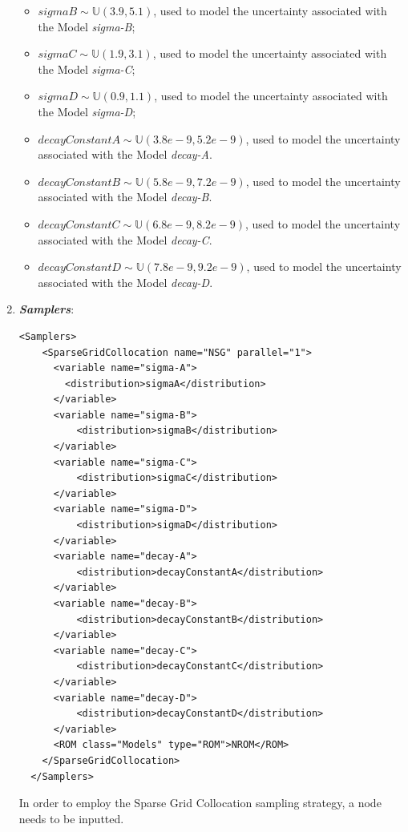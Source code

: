 \begin{enumerate}
\begin{itemize}
    \item $sigmaB \sim \mathbb{U}(3.9,5.1)$, used to model the uncertainty 
    associated with  the Model \textit{sigma-B};
    \item $sigmaC \sim \mathbb{U}(1.9,3.1)$, used to model the uncertainty 
    associated with  the Model \textit{sigma-C};
    \item $sigmaD \sim \mathbb{U}(0.9,1.1)$, used to model the uncertainty 
    associated with  the Model \textit{sigma-D};
    \item  $decayConstantA \sim \mathbb{U}(3.8e-9,5.2e-9)$,  used to 
    model the uncertainty 
    associated with  the Model \textit{decay-A}.
    \item  $decayConstantB \sim \mathbb{U}(5.8e-9,7.2e-9)$,  used to 
    model the uncertainty 
    associated with  the Model \textit{decay-B}.
    \item  $decayConstantC \sim \mathbb{U}(6.8e-9,8.2e-9)$,  used to 
    model the uncertainty 
    associated with  the Model \textit{decay-C}.
    \item  $decayConstantD \sim \mathbb{U}(7.8e-9,9.2e-9)$,  used to 
    model the uncertainty 
    associated with  the Model \textit{decay-D}.
  \end{itemize}
   \item \textbf{\textit{Samplers}}:
\begin{lstlisting}[style=XML,morekeywords={arg,extension,pauseAtEnd,overwrite}]
  <Samplers>
    <SparseGridCollocation name="NSG" parallel="1">
      <variable name="sigma-A">
        <distribution>sigmaA</distribution>
      </variable>
      <variable name="sigma-B">
          <distribution>sigmaB</distribution>
      </variable>
      <variable name="sigma-C">
          <distribution>sigmaC</distribution>
      </variable>
      <variable name="sigma-D">
          <distribution>sigmaD</distribution>
      </variable>
      <variable name="decay-A">
          <distribution>decayConstantA</distribution>
      </variable>
      <variable name="decay-B">
          <distribution>decayConstantB</distribution>
      </variable>
      <variable name="decay-C">
          <distribution>decayConstantC</distribution>
      </variable>
      <variable name="decay-D">
          <distribution>decayConstantD</distribution>
      </variable>
      <ROM class="Models" type="ROM">NROM</ROM>
    </SparseGridCollocation>
  </Samplers> 
\end{lstlisting}
  In order to employ the Sparse Grid Collocation sampling strategy, a 
   node needs to be inputted. 

\end{enumerate}
